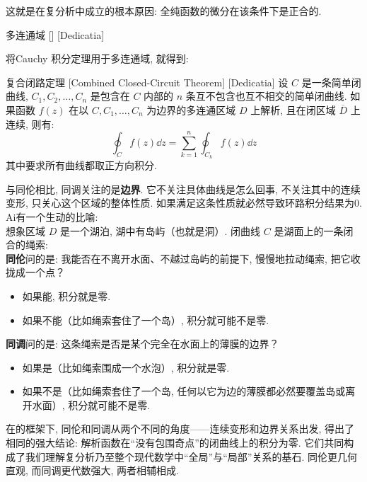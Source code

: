 \documentclass[UTF8]{ctexart}
\begin{document}
        这就是\CauchyThm 在复分析中成立的根本原因: 全纯函数的微分在该条件下是正合的. 

        \begin{dfn}
            [UUID]
            {多连通域}
            []
            [Dedicatia]
        \end{dfn}

        将Cauchy 积分定理用于多连通域, 就得到: 

        \begin{thm}
            [CombinedClosedCircuit]
            {复合闭路定理}
            [Combined Closed-Circuit Theorem]
            [Dedicatia]
            设  \(C\)  是一条简单闭曲线,  \(C_1, C_2, \ldots, C_n\)  是包含在  \(C\)  内部的  \(n\)  条互不包含也互不相交的简单闭曲线. 如果函数  \(f(z)\)  在以  \(C, C_1, \ldots, C_n\)  为边界的多连通区域 \(D\) 上解析, 且在闭区域  \(\overline{D}\)  上连续, 则有: 
            \[\oint_C f(z) \dd z = \sum_{k=1}^n \oint_{C_k} f(z) \dd z\]
            其中要求所有曲线都取正方向积分. 
        \end{thm}

        与同伦相比, 同调关注的是\textbf{边界}. 它不关注具体曲线是怎么回事, 不关注其中的连续变形, 只关心这个区域的整体性质. 如果满足这条性质就必然导致环路积分结果为0.\\
        Ai有一个生动的比喻:\\
        想象区域  \(D\)  是一个湖泊, 湖中有岛屿（也就是洞）. 闭曲线  \(C\)  是湖面上的一条闭合的绳索:\\
        \textbf{同伦}问的是: 我能否在不离开水面、不越过岛屿的前提下, 慢慢地拉动绳索, 把它收拢成一个点？

        \begin{itemize}
            \item 如果能, 积分就是零. 
            \item 如果不能（比如绳索套住了一个岛）, 积分就可能不是零. 
        \end{itemize}

        \textbf{同调}问的是: 这条绳索是否是某个完全在水面上的薄膜的边界？

        \begin{itemize}
            \item 如果是（比如绳索围成一个水泡）, 积分就是零. 
            \item 如果不是（比如绳索套住了一个岛, 任何以它为边的薄膜都必然要覆盖岛或离开水面）, 积分就可能不是零. 
        \end{itemize}

        在\CauchyThm 的框架下, 同伦和同调从两个不同的角度——连续变形和边界关系出发, 得出了相同的强大结论: 解析函数在“没有包围奇点”的闭曲线上的积分为零. 它们共同构成了我们理解复分析乃至整个现代数学中“全局”与“局部”关系的基石. 同伦更几何直观, 而同调更代数强大, 两者相辅相成. 
\end{document}
